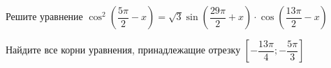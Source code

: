 \begin{ex}
	\begin{condition}
		\begin{enumcols}[label=\asbuk*)]
			\item Решите уравнение \( \cos^2 {\left(\dfrac{5\pi}{2}- x\right)} = \sqrt{3}\sin{\left(\dfrac{29\pi}{2}+x\right)}\cdot \cos{\left(\dfrac{13\pi}{2}-x\right)} \)
			\item Найдите все корни уравнения, принадлежащие отрезку \( \left[-\dfrac{13\pi}{4};-\dfrac{5\pi}{3}\right] \)
		\end{enumcols}
	\end{condition}
\end{ex}